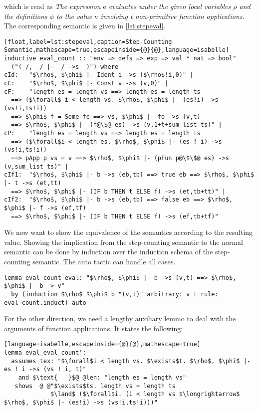 which is read as \textit{The expression $\text{e}$ evaluates under the given local variables $\rho$ and the definitions $\phi$ to the value $\text{v}$ involving t non-primitive function applications}. The corresponding semantic is given in \autoref{lst:stepeval}.
\begin{lstlisting}[float,label=lst:stepeval,caption=Step-Counting Semantic,mathescape=true,escapeinside={@}{@},language=isabelle]
inductive eval_count :: "env => defs => exp => val * nat => bool"
  ("(_/, _/ |- _/ ->s _)") where
cId:   "$\rho$, $\phi$ |- Ident i ->s ($\rho$!i,0)" |
cC:    "$\rho$, $\phi$ |- Const v ->s (v,0)" |
cF:    "length es = length vs ==> length es = length ts
  ==> ($\forall$ i < length vs. $\rho$, $\phi$ |- (es!i) ->s (vs!i,ts!i))
  ==> $\phi$ f = Some fe ==> vs, $\phi$ |- fe ->s (v,t)
  ==> $\rho$, $\phi$ |- (f@\$@ es) ->s (v,1+t+sum_list ts)" |
cP:    "length es = length vs ==> length es = length ts
  ==> ($\forall$i < length es. $\rho$, $\phi$ |- (es ! i) ->s (vs!i,ts!i))
  ==> pApp p vs = v ==> $\rho$, $\phi$ |- (pFun p@\$\$@ es) ->s (v,sum_list ts)" |
cIf1:  "$\rho$, $\phi$ |- b ->s (eb,tb) ==> true eb ==> $\rho$, $\phi$ |- t ->s (et,tt)
  ==> $\rho$, $\phi$ |- (IF b THEN t ELSE f) ->s (et,tb+tt)" |
cIf2:  "$\rho$, $\phi$ |- b ->s (eb,tb) ==> false eb ==> $\rho$, $\phi$ |- f ->s (ef,tf)
  ==> $\rho$, $\phi$ |- (IF b THEN t ELSE f) ->s (ef,tb+tf)"
\end{lstlisting}

We now want to show the equivalence of the semantics according to the resulting value.
Showing the implication from the step-counting semantic to the normal semantic can be done by induction over the induction schema of the step-counting semantic.
The auto tactic can handle all cases.
\begin{lstlisting}[language=isabelle,mathescape=true]
  lemma eval_count_eval: "$\rho$, $\phi$ |- b ->s (v,t) ==> $\rho$, $\phi$ |- b -> v"
  by (induction $\rho$ $\phi$ b "(v,t)" arbitrary: v t rule: eval_count.induct) auto
\end{lstlisting}

For the other direction, we need a lengthy auxiliary lemmo to deal with the arguments of function applications.
It states the following:
\begin{lstlisting}[language=isabelle,escapeinside={@}{@},mathescape=true]
lemma eval_eval_count':
  assumes tex: "$\forall$i < length vs. $\exists$t. $\rho$, $\phi$ |- es ! i ->s (vs ! i, t)"
    and $\text{   }$@ @len: "length es = length vs"
   shows  @ @"$\exists$ts. length vs = length ts
             $\land$ ($\forall$i. (i < length vs $\longrightarrow$ $\rho$, $\phi$ |- (es!i) ->s (vs!i,ts!i)))"
\end{lstlisting}

